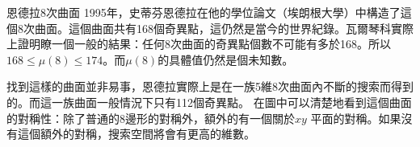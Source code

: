 \begin{surferPage}{恩德拉8次曲面}
1995年，史蒂芬恩德拉在他的學位論文（埃朗根大學）中構造了這個8次曲面。這個曲面共有168個奇異點，這仍然是當今的世界紀錄。瓦爾琴科實際上證明瞭一個一般的結果：任何8次曲面的奇異點個數不可能有多於168。所以$168 \le \mu(8) \le 174$。而$\mu(8)$的具體值仍然是個未知數。

找到這樣的曲面並非易事，恩德拉實際上是在一族5維8次曲面內不斷的搜索而得到的。而這一族曲面一般情況下只有112個奇異點。
在圖中可以清楚地看到這個曲面的對稱性：除了普通的8邊形的對稱外，額外的有一個關於$xy$ 平面的對稱。如果沒有這個額外的對稱，搜索空間將會有更高的維數。
\end{surferPage}

